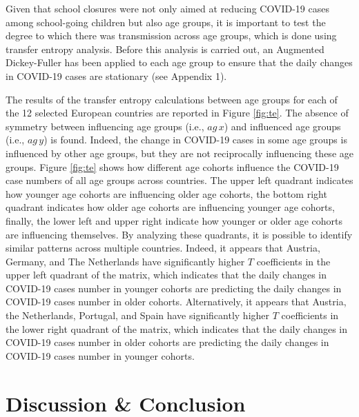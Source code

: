 \documentclass[unnumsec,webpdf,contemporary,large]{oup-authoring-template}%
\theoremstyle{thmstyleone}%
\theoremstyle{thmstyletwo}%
\theoremstyle{thmstylethree}%
\begin{document}
Given that school closures were not only aimed at reducing COVID-19 cases among school-going children but also age groups, it is important to test the degree to which there was transmission across age groups, which is done using transfer entropy analysis. Before this analysis is carried out, an Augmented Dickey-Fuller has been applied to each age group to ensure that the daily changes in COVID-19 cases are stationary (see Appendix 1).

The results of the transfer entropy calculations between age groups for each of the 12 selected European countries are reported in Figure \ref{fig:te}. The absence of symmetry between influencing age groups (i.e., \(ag\,x\)) and influenced age groups (i.e., \(ag\,y\)) is found. Indeed, the change in COVID-19 cases in some age groups is influenced by other age groups, but they are not reciprocally influencing these age groups. Figure \ref{fig:te} shows how different age cohorts influence the COVID-19 case numbers of all age groups across countries. The upper left quadrant indicates how younger age cohorts are influencing older age cohorts, the bottom right quadrant indicates how older age cohorts are influencing younger age cohorts, finally, the lower left and upper right indicate how younger or older age cohorts are influencing themselves. By analyzing these quadrants, it is possible to identify similar patterns across multiple countries. Indeed, it appears that Austria, Germany, and The Netherlands have significantly higher \(T\) coefficients in the upper left quadrant of the matrix, which indicates that the daily changes in COVID-19 cases number in younger cohorts are predicting the daily changes in COVID-19 cases number in older cohorts. Alternatively, it appears that Austria, the Netherlands, Portugal, and Spain have significantly higher \(T\) coefficients in the lower right quadrant of the matrix, which indicates that the daily changes in COVID-19 cases number in older cohorts are predicting the daily changes in COVID-19 cases number in younger cohorts.

\hypertarget{discussion-conclusion}{%
\section{Discussion \& Conclusion}\label{discussion-conclusion}}
\end{document}
